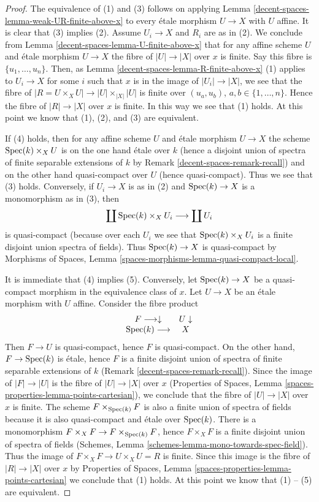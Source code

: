 \begin{proof}
The equivalence of (1) and (3) follows on applying
Lemma \ref{decent-spaces-lemma-weak-UR-finite-above-x}
to every \'etale morphism $U \to X$ with $U$ affine.
It is clear that (3) implies (2).
Assume $U_i \to X$ and $R_i$ are as in (2). We conclude from
Lemma \ref{decent-spaces-lemma-U-finite-above-x}
that for any affine scheme $U$ and \'etale morphism $U \to X$
the fibre of $|U| \to |X|$ over $x$ is finite.
Say this fibre is $\{u_1, \ldots, u_n\}$. Then, as
Lemma \ref{decent-spaces-lemma-R-finite-above-x} (1)
applies to $U_i \to X$ for some $i$ such that $x$ is in the image of
$|U_i| \to |X|$, we see that the fibre of
$|R = U \times_X U| \to |U| \times_{|X|} |U|$
is finite over $(u_a, u_b)$, $a, b \in \{1, \ldots, n\}$.
Hence the fibre of $|R| \to |X|$ over $x$ is finite.
In this way we see that (1) holds. At this point we know that
(1), (2), and (3) are equivalent.

\medskip\noindent
If (4) holds, then for any affine scheme $U$ and \'etale morphism
$U \to X$ the scheme $\operatorname{Spec}(k) \times_X U$ is on the one hand
\'etale over $k$ (hence a disjoint union of spectra of finite separable
extensions of $k$ by
Remark \ref{decent-spaces-remark-recall})
and on the other hand quasi-compact over $U$ (hence quasi-compact).
Thus we see that (3) holds.
Conversely, if $U_i \to X$ is as in (2) and $\operatorname{Spec}(k) \to X$
is a monomorphism as in (3), then
$$
\coprod \operatorname{Spec}(k) \times_X U_i
\longrightarrow
\coprod U_i
$$
is quasi-compact (because over each $U_i$ we see that
$\operatorname{Spec}(k) \times_X U_i$ is a finite disjoint union spectra of fields).
Thus $\operatorname{Spec}(k) \to X$ is quasi-compact by
Morphisms of Spaces, Lemma \ref{spaces-morphisms-lemma-quasi-compact-local}.

\medskip\noindent
It is immediate that (4) implies (5). Conversely, let $\operatorname{Spec}(k) \to X$
be a quasi-compact morphism in the equivalence class of $x$. Let $U \to X$
be an \'etale morphism with $U$ affine. Consider the fibre product
$$
\begin{array}{cc}F \longrightarrow\downarrow & U \downarrow \\ \operatorname{Spec}(k) \longrightarrow & X\end{array}
$$
Then $F \to U$ is quasi-compact, hence $F$ is quasi-compact.
On the other hand, $F \to \operatorname{Spec}(k)$ is \'etale, hence $F$ is a
finite disjoint union of spectra of finite separable extensions of $k$
(Remark \ref{decent-spaces-remark-recall}). Since the image of $|F| \to |U|$
is the fibre of $|U| \to |X|$ over $x$ (Properties of Spaces, Lemma
\ref{spaces-properties-lemma-points-cartesian}), we conclude that
the fibre of $|U| \to |X|$ over $x$ is finite. The scheme
$F \times_{\operatorname{Spec}(k)} F$ is also a finite union of spectra of fields
because it is also quasi-compact and \'etale over $\operatorname{Spec}(k)$.
There is a monomorphism
$F \times_X F \to F \times_{\operatorname{Spec}(k)} F$, hence $F \times_X F$ is
a finite disjoint union of spectra of fields
(Schemes, Lemma \ref{schemes-lemma-mono-towards-spec-field}).
Thus the image of $F \times_X F \to U \times_X U = R$ is finite.
Since this image is the fibre of $|R| \to |X|$ over $x$ by
Properties of Spaces, Lemma \ref{spaces-properties-lemma-points-cartesian}
we conclude that (1) holds. At this point we know that
(1) -- (5) are equivalent.


\end{proof}
